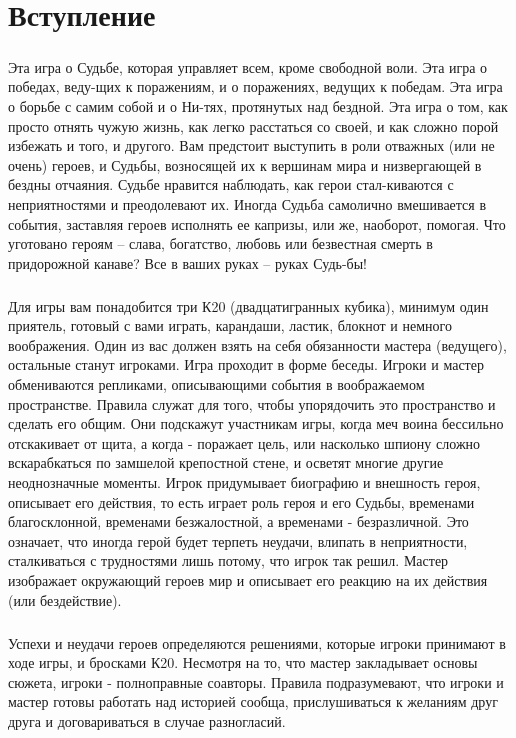 \chapter*{Вступление}
\paragraph{}Эта игра о Судьбе, которая управляет всем, кроме свободной воли. Эта игра о победах, веду-щих к поражениям, и о поражениях, ведущих к победам. Эта игра о борьбе с самим собой и о Ни-тях, протянутых над бездной. Эта игра о том, как просто отнять чужую жизнь, как легко расстаться со своей, и как сложно порой избежать и того, и другого. 
\newline Вам предстоит выступить в роли отважных (или не очень) героев, и Судьбы, возносящей их к вершинам мира и низвергающей в бездны отчаяния. Судьбе нравится наблюдать, как герои стал-киваются с неприятностями и преодолевают их. Иногда Судьба самолично вмешивается в события, заставляя героев исполнять ее капризы, или же, наоборот, помогая. Что уготовано героям – слава, богатство, любовь или безвестная смерть в придорожной канаве? Все в ваших руках – руках Судь-бы!

\paragraph{}Для игры вам понадобится три К20 (двадцатигранных кубика), минимум один приятель, готовый с вами играть, карандаши, ластик, блокнот и немного воображения. Один из вас должен взять на себя обязанности мастера (ведущего), остальные станут игроками. Игра проходит в форме беседы. Игроки и мастер обмениваются репликами, описывающими события в воображаемом пространстве. Правила служат для того, чтобы упорядочить это пространство и сделать его общим. Они подскажут участникам игры, когда меч воина бессильно отскакивает от щита, а когда - поражает цель, или насколько шпиону сложно вскарабкаться по замшелой крепостной стене, и осветят многие другие неоднозначные моменты. Игрок придумывает биографию и внешность героя, описывает его действия, то есть играет роль героя и его Судьбы, временами благосклонной, временами безжалостной, а временами - безразличной. Это означает, что иногда герой будет терпеть неудачи, влипать в неприятности, сталкиваться с трудностями лишь потому, что игрок так решил. Мастер изображает окружающий героев мир и описывает его реакцию на их действия (или бездействие).

\paragraph{}Успехи и неудачи героев определяются решениями, которые игроки принимают в ходе игры, и бросками К20. Несмотря на то, что мастер закладывает основы сюжета, игроки - полноправные соавторы. Правила подразумевают, что игроки и мастер готовы работать над историей сообща, прислушиваться к желаниям друг друга и договариваться в случае разногласий.

